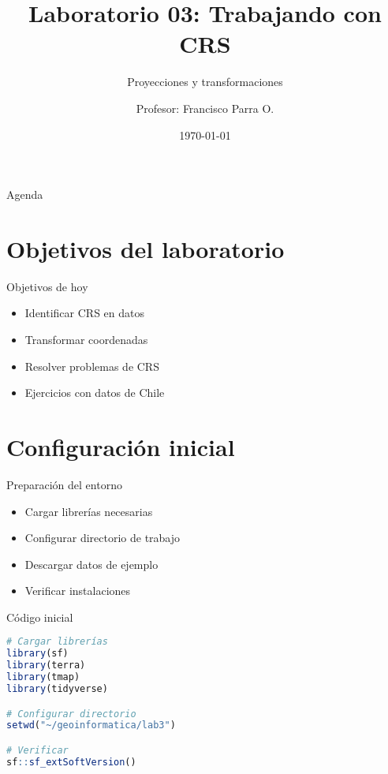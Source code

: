\documentclass[10pt]{beamer}
\title{Laboratorio 03: Trabajando con CRS}
\subtitle{Proyecciones y transformaciones}
\author{Profesor: Francisco Parra O.}
\institute{USACH - Ingeniería Civil en Informática}
\date{\today}
\begin{document}
\maketitle

\begin{frame}{Agenda}
    \tableofcontents
\end{frame}


\section{Objetivos del laboratorio}

\begin{frame}{Objetivos de hoy}
    \begin{itemize}
        \item Identificar CRS en datos
        \item Transformar coordenadas
        \item Resolver problemas de CRS
        \item Ejercicios con datos de Chile
    \end{itemize}
\end{frame}

\section{Configuración inicial}

\begin{frame}{Preparación del entorno}
    \begin{itemize}
        \item Cargar librerías necesarias
        \item Configurar directorio de trabajo
        \item Descargar datos de ejemplo
        \item Verificar instalaciones
    \end{itemize}
\end{frame}

\begin{frame}[fragile]{Código inicial}
    \begin{lstlisting}[language=R]
# Cargar librerías
library(sf)
library(terra)
library(tmap)
library(tidyverse)

# Configurar directorio
setwd("~/geoinformatica/lab3")

# Verificar
sf::sf_extSoftVersion()
    \end{lstlisting}
\end{frame}
\end{document}
